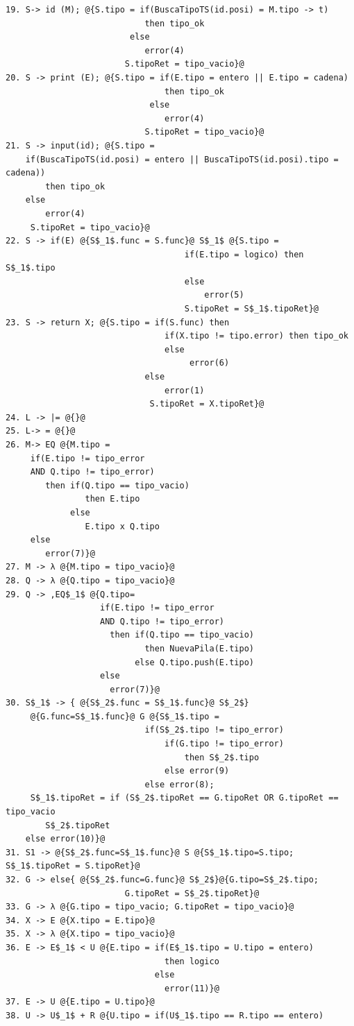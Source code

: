 \documentclass[a4paper, 12pt]{article}
\begin{document}
\begin{lstlisting}[style=EdT]
19. S-> id (M); @{S.tipo = if(BuscaTipoTS(id.posi) = M.tipo -> t)
        					then tipo_ok
    					 else
        					error(4)
        				S.tipoRet = tipo_vacio}@
20. S -> print (E); @{S.tipo = if(E.tipo = entero || E.tipo = cadena)
        						then tipo_ok
    						 else
        						error(4)
        					S.tipoRet = tipo_vacio}@
21. S -> input(id); @{S.tipo =
	if(BuscaTipoTS(id.posi) = entero || BuscaTipoTS(id.posi).tipo = cadena))
    	then tipo_ok
    else
    	error(4)
     S.tipoRet = tipo_vacio}@
22. S -> if(E) @{S$_1$.func = S.func}@ S$_1$ @{S.tipo =
    								if(E.tipo = logico) then S$_1$.tipo
    								else
        								error(5)
     								S.tipoRet = S$_1$.tipoRet}@
23. S -> return X; @{S.tipo = if(S.func) then
        						if(X.tipo != tipo.error) then tipo_ok
        						else
           							 error(6)
     						else
        						error(1)
    						 S.tipoRet = X.tipoRet}@
24. L -> |= @{}@
25. L-> = @{}@
26. M-> EQ @{M.tipo =
     if(E.tipo != tipo_error
     AND Q.tipo != tipo_error)
        then if(Q.tipo == tipo_vacio)
                then E.tipo
             else
                E.tipo x Q.tipo
     else
        error(7)}@
27. M -> λ @{M.tipo = tipo_vacio}@
28. Q -> λ @{Q.tipo = tipo_vacio}@
29. Q -> ,EQ$_1$ @{Q.tipo=
                   if(E.tipo != tipo_error
                   AND Q.tipo != tipo_error)
                     then if(Q.tipo == tipo_vacio)
                            then NuevaPila(E.tipo)
                          else Q.tipo.push(E.tipo)
                   else
                     error(7)}@
30. S$_1$ -> { @{S$_2$.func = S$_1$.func}@ S$_2$}
     @{G.func=S$_1$.func}@ G @{S$_1$.tipo =
                            if(S$_2$.tipo != tipo_error)
                                if(G.tipo != tipo_error)
                                    then S$_2$.tipo
                                else error(9)
                            else error(8);
     S$_1$.tipoRet = if (S$_2$.tipoRet == G.tipoRet OR G.tipoRet == tipo_vacio
		S$_2$.tipoRet
	else error(10)}@
31. S1 -> @{S$_2$.func=S$_1$.func}@ S @{S$_1$.tipo=S.tipo; S$_1$.tipoRet = S.tipoRet}@
32. G -> else{ @{S$_2$.func=G.func}@ S$_2$}@{G.tipo=S$_2$.tipo; 
						G.tipoRet = S$_2$.tipoRet}@
33. G -> λ @{G.tipo = tipo_vacio; G.tipoRet = tipo_vacio}@
34. X -> E @{X.tipo = E.tipo}@
35. X -> λ @{X.tipo = tipo_vacio}@
36. E -> E$_1$ < U @{E.tipo = if(E$_1$.tipo = U.tipo = entero)
                                then logico
                              else
                                error(11)}@
37. E -> U @{E.tipo = U.tipo}@
38. U -> U$_1$ + R @{U.tipo = if(U$_1$.tipo == R.tipo == entero)

\end{lstlisting}
\end{document}
